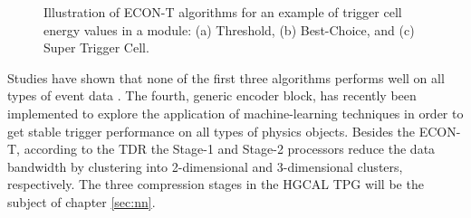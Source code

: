 \documentclass[../../main.tex]{subfiles}
\begin{document}
\begin{figure}[htp]
	\begin{center}
		\hspace{4cm}
		\hspace{4cm}
		\caption{Illustration of ECON-T algorithms for an example of trigger cell energy values in a module: (a) Threshold, (b) Best-Choice, and (c) Super Trigger Cell.}
		\label{fig:stc}
	\end{center}
\end{figure}
Studies have shown that none of the first three algorithms performs well on all types of event data \cite{trig_algos}. The fourth, generic encoder block, has recently been implemented to explore the application of machine-learning techniques in order to get stable trigger performance on all types of physics objects. Besides the ECON-T, according to the TDR \cite{tdr_hgcal} the Stage-1 and Stage-2 processors reduce the data bandwidth by clustering into 2-dimensional and 3-dimensional clusters, respectively. The three compression stages in the HGCAL TPG will be the subject of chapter \ref{sec:nn}.\\
\end{document}
